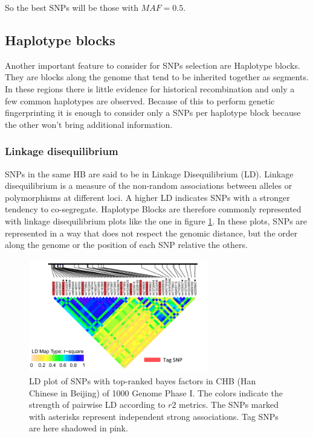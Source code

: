 		So the best SNPs will be those with $MAF = 0.5$.

	\subsection{Haplotype blocks}
	Another important feature to consider for SNPs selection are Haplotype blocks.
	They are blocks along the genome that tend to be inherited together as segments.
	In these regions there is little evidence for historical recombination and only a few common haplotypes are observed.
	Because of this to perform genetic fingerprinting it is enough to consider only a SNPs per haplotype block because the other won't bring additional information.

		\subsubsection{Linkage disequilibrium}
		SNPs in the same HB are said to be in Linkage Disequilibrium (LD).
		Linkage disequilibrium is a measure of the non-random associations between alleles or polymorphisms at different loci.
		A higher LD indicates SNPs with a stronger tendency to co-segregate.
		Haplotype Blocks are therefore commonly represented with linkage disequilibrium plots like the one in figure \ref{fig:linkage}.
		In these plots, SNPs are represented in a way that does not respect the genomic distance, but the order along the genome or the position of each SNP relative the others.

		\begin{figure}[H]
			\centering
			\includegraphics[width=0.7\textwidth]{linkage.png}
			\caption{\label{fig:linkage}LD plot of SNPs with top-ranked bayes factors in CHB (Han Chinese in Beijing) of 1000 Genome Phase I. The colors indicate the strength of pairwise LD according to $r2$ metrics. The SNPs marked with asterisks represent independent strong associations. Tag SNPs are here shadowed in pink.}
		\end{figure}

